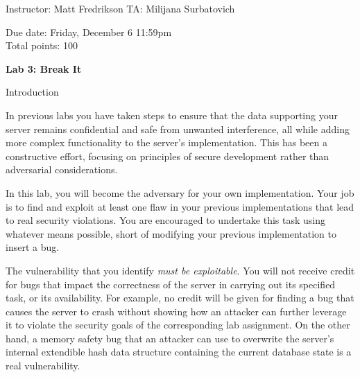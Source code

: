 \documentclass[11pt]{article}
\newcommand*{\stuname}{}
\newcommand*{\assignmentnumb}{3}
\begin{document}
\centerline{Instructor: Matt Fredrikson \hfill TA: Milijana Surbatovich} 
Due date: Friday, December 6 11:59pm \\
Total points: 100 \\[1.5em]
\vspace{1.5ex}
\centerline{\Large\bf Lab \assignmentnumb: Break It}
\vspace{0.5ex}
\centerline{\Large\bf \stuname}

\begin{problem}{Introduction}

In previous labs you have taken steps to ensure that the data supporting your server remains confidential and safe from unwanted interference, all while adding more complex functionality to the server's implementation. This has been a constructive effort, focusing on principles of secure development rather than adversarial considerations.

In this lab, you will become the adversary for your own implementation. Your job is to find and exploit at least one flaw in your previous implementations that lead to real security violations. You are encouraged to undertake this task using whatever means possible, short of modifying your previous implementation to insert a bug. 

The vulnerability that you identify \emph{must be exploitable}. You will not receive credit for bugs that impact the correctness of the server in carrying out its specified task, or its availability. For example, no credit will be given for finding a bug that causes the server to crash without showing how an attacker can further leverage it to violate the security goals of the corresponding lab assignment. On the other hand, a memory safety bug that an attacker can use to overwrite the server's internal extendible hash data structure containing the current database state is a real vulnerability.


\end{problem}
\end{document}
